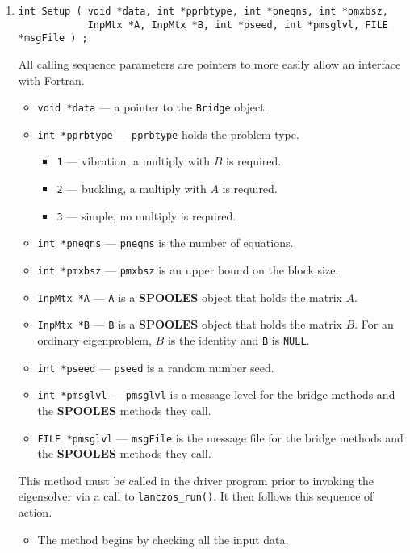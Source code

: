 \begin{enumerate}
\item
\begin{verbatim}
int Setup ( void *data, int *pprbtype, int *pneqns, int *pmxbsz,
            InpMtx *A, InpMtx *B, int *pseed, int *pmsglvl, FILE *msgFile ) ;
\end{verbatim}
\noindent All calling sequence parameters are pointers to more
easily allow an interface with Fortran.
\begin{itemize}
\item {\tt void *data} --- a pointer to the {\tt Bridge} object.
\item {\tt int *pprbtype} --- {\tt *pprbtype} holds the problem type.
   \begin{itemize}
   \item {\tt 1} --- vibration, a multiply with $B$ is required.
   \item {\tt 2} --- buckling, a multiply with $A$ is required.
   \item {\tt 3} --- simple, no multiply is required.
   \end{itemize}
\item {\tt int *pneqns} --- {\tt *pneqns} is the number of equations.
\item {\tt int *pmxbsz} --- {\tt *pmxbsz} is an upper bound on the
block size.
\item {\tt InpMtx *A} --- {\tt A} is a {\bf SPOOLES} object that
holds the matrix $A$.
\item {\tt InpMtx *B} --- {\tt B} is a {\bf SPOOLES} object that
holds the matrix $B$. For an ordinary eigenproblem, $B$ is the
identity and {\tt B} is {\tt NULL}.
\item {\tt int *pseed} --- {\tt *pseed} is a random number seed.
\item {\tt int *pmsglvl} --- {\tt *pmsglvl} is a message level for
the bridge methods and the {\bf SPOOLES} methods they call.
\item {\tt FILE *pmsglvl} --- {\tt msgFile} is the message file
for the bridge methods and the {\bf SPOOLES} methods they call.
\end{itemize}
This method must be called in the driver program prior to invoking
the eigensolver via a call to {\tt lanczos\_run()}.
It then follows this sequence of action.
\begin{itemize}
\item
The method begins by checking all the input data,

\end{itemize}
\end{enumerate}
